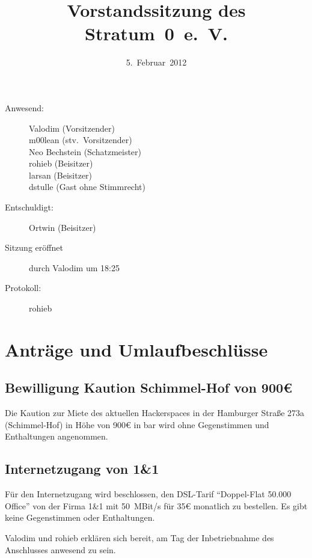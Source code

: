 \documentclass[a4paper,12pt]{scrartcl}
\title{Vorstandssitzung des Stratum~0~e.~V.}
\date{5.~Februar~2012}
\begin{document}
\maketitle

\begin{description}
 \item[Anwesend:] Valodim (Vorsitzender) \\
    m00lean (stv.~Vorsitzender) \\
    Neo Bechstein (Schatzmeister) \\
    rohieb (Beisitzer) \\
    larsan (Beisitzer) \\
    dstulle (Gast ohne Stimmrecht)
	\item[Entschuldigt:] Ortwin (Beisitzer)
  \item[Sitzung eröffnet] durch Valodim um 18:25
  \item[Protokoll:] rohieb
\end{description}

\section{Anträge und Umlaufbeschlüsse}
\subsection{Bewilligung Kaution Schimmel-Hof von 900€}
Die Kaution zur Miete des aktuellen Hackerspaces in der Hamburger Straße 273a
(Schimmel-Hof) in Höhe von 900€ in bar wird ohne Gegenstimmen und Enthaltungen
angenommen.

\subsection{Internetzugang von 1\&1}
Für den Internetzugang wird beschlossen, den DSL-Tarif "`Doppel-Flat 50.000
Office"' von der Firma 1\&1 mit 50~MBit/s für 35€ monatlich zu bestellen. Es
gibt keine Gegenstimmen oder Enthaltungen.

Valodim und rohieb erklären sich bereit, am Tag der Inbetriebnahme des
Anschlusses anwesend zu sein.
\end{document}
